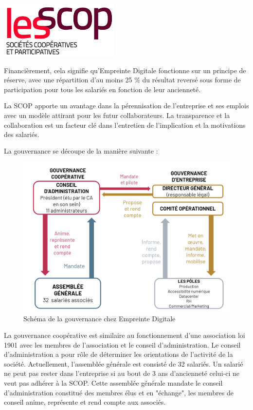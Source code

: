 \documentclass[12pt]{article}
\begin{document}
\begin{minipage}{.3\textwidth}%
\begin{center}
\includegraphics[scale=0.2]{src/scop.png}
\end{center}
\end{minipage}%

Financièrement, cela signifie qu'Empreinte Digitale fonctionne sur un principe de réserve, avec une répartition d'au moins 25 \% du résultat reversé sous forme de participation pour tous les salariés en fonction de leur ancienneté.

La SCOP apporte un avantage dans la pérennisation de l'entreprise et ses emplois avec un modèle attirant pour les futur collaborateurs. 
La transparence et la collaboration est un facteur clé dans l'entretien de l'implication et la motivations des salariés.

La gouvernance se découpe de la manière suivante :
\begin{figure}[!ht]
    \centering
    \includegraphics[width=\textwidth]{src/gouvernance_ed.png}
    \caption{Schéma de la gouvernance chez Empreinte Digitale}
    \label{fig:gouvernance_ed}
\end{figure}

La gouvernance coopérative est similaire au fonctionnement d'une association loi 1901 avec les membres de l'association et le conseil d'administration. 
Le conseil d'administration a pour rôle de déterminer les orientations de l'activité de la société. 
Actuellement, l'assemblée générale est consisté de 32 salariés. 
Un salarié ne peut pas rester dans l'entreprise si au bout de 3 ans d'ancienneté celui-ci ne veut pas adhérer à la SCOP. 
Cette assemblée générale mandate le conseil d'administration constitué des membres élus et en "échange", les membres de conseil anime, représente et rend compte aux associés.
\end{document}
